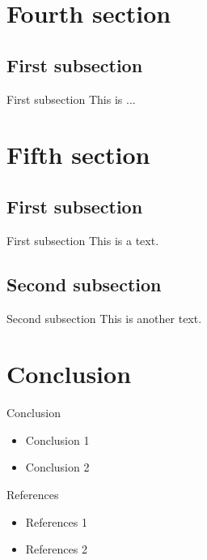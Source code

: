 \documentclass{beamer}
\begin{document}
\section{Fourth section}
\subsection{First subsection}
\begin{frame}{First subsection}
    This is ...
\end{frame}


\section{Fifth section}
\subsection{First subsection}
\begin{frame}{First subsection}
    This is a text.
\end{frame}


\subsection{Second subsection}
\begin{frame}{Second subsection}
    This is another text.
\end{frame}


\section{Conclusion}
\begin{frame}{Conclusion}
    \begin{itemize}
        \item Conclusion 1
        \item Conclusion 2
    \end{itemize}
\end{frame}

\begin{frame}[plain]
\end{frame}


\begin{frame}[plain]
\end{frame}
 

\begin{frame}{References}
    \begin{itemize}
        \item References 1
        \item References 2
    \end{itemize}
\end{frame}
\end{document}
